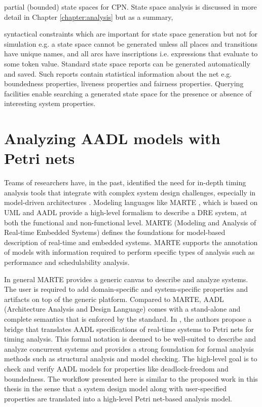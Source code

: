 partial (bounded) state spaces for CPN. State space analysis is discussed in
more detail in Chapter \ref{chapter:analysis} but as a summary,

syntactical constraints which are important for state space generation but not
for simulation e.g. a state space cannot be generated unless all places and
transitions have unique names, and all arcs have inscriptions i.e. expressions
that evaluate to some token value. Standard state space reports can be generated
automatically and saved. Such reports contain statistical information about the
net e.g. boundedness properties, liveness properties and fairness properties.
Querying facilities enable searching a generated state space for the presence or
absence of interesting system properties.

\section{Analyzing AADL models with Petri nets}

Teams of researchers have, in the past, identified the need for in-depth timing
analysis tools that integrate with complex system design challenges, especially
in model-driven architectures \cite{kordon_sn}. Modeling languages like MARTE
\cite{MARTE:05}, which is based on UML and AADL \cite{AADL_Intro:06} provide a
high-level formalism to describe a DRE system, at both the functional and
non-functional level. MARTE (Modeling and Analysis of Real-time Embedded
Systems) defines the foundations for model-based description of real-time and
embedded systems. MARTE supports the annotation of models with information
required to perform specific types of analysis such as performance and
schedulability analysis.

In general MARTE provides a generic canvas to describe and analyze systems. The
user is required to add domain-specific and system-specific properties and
artifacts on top of the generic platform. Compared to MARTE, AADL (Architecture
Analysis and Design Language) comes with a stand-alone and complete semantics
that is enforced by the standard. In \cite{kordon_sn}, the authors propose a
bridge that translates AADL specifications of real-time systems to Petri nets
for timing analysis. This formal notation is deemed to be well-suited to
describe and analyze concurrent systems and provides a strong foundation for
formal analysis \cite{girault2013petri} methods such as structural analysis and
model checking. The high-level goal is to check and verify AADL models for
properties like deadlock-freedom and boundedness. The workflow presented here is
similar to the proposed work in this thesis in the sense that a system design
model along with user-specified properties are translated into a high-level
Petri net-based analysis model.

